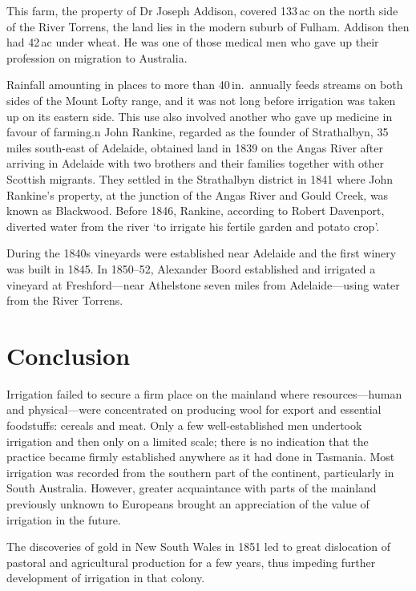 This farm, the property of Dr Joseph Addison, covered 133\,ac on the
north side of the River Torrens, the land lies in the modern suburb of
Fulham.  Addison then had 42\,ac under wheat. He was one of those
medical men who gave up their profession on migration to
Australia.

Rainfall amounting in places to more than 40\,in.\ annually feeds
streams on both sides of the Mount Lofty range, and it was not long
before irrigation was taken up on its eastern side.  This use also
involved another who gave up medicine in favour of farming.n John
Rankine, regarded as the founder of Strathalbyn, 35 miles south-east
of Adelaide, obtained land in 1839 on the Angas River after arriving
in Adelaide with two brothers and their families together with other
Scottish migrants.  They settled in the Strathalbyn district in 1841
where John Rankine's property, at the junction of the Angas River and
Gould Creek, was known as Blackwood.  Before 1846, Rankine, according
to Robert Davenport, diverted water from the river `to irrigate his
fertile garden and potato crop'.

During the 1840s vineyards were established near Adelaide and the
first winery was built in 1845.  In 1850--52, Alexander Boord
established and irrigated a vineyard at Freshford---near Athelstone
seven miles from Adelaide---using water from the River
Torrens.

\section*{Conclusion}

Irrigation failed to secure a firm place on the mainland where
resources---human and physical---were concentrated on producing wool
for export and essential foodstuffs: cereals and meat.  Only a few
well-established men undertook irrigation and then only on a limited
scale; there is no indication that the practice became firmly
established anywhere as it had done in Tasmania.  Most irrigation was
recorded from the southern part of the continent, particularly in
South Australia.  However, greater acquaintance with parts of the
mainland previously unknown to Europeans brought an appreciation of
the value of irrigation in the future.

The discoveries of gold in New South Wales in 1851 led to great
dislocation of pastoral and agricultural production for a few years,
thus impeding further development of irrigation in that colony.

